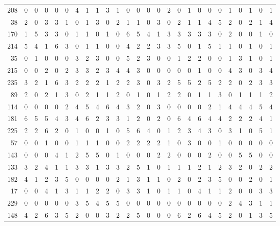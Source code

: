 \begin{longtable}{@{\extracolsep{\fill}}rccccccccccccccccccccccccc@{}}
208 & 0 & 0 & 0 & 0 & 0 & 4 & 1 & 1 & 3 & 1 & 0 & 0 & 0 & 0 & 2 & 0 & 1 & 0 & 0 & 0 & 1 & 0 & 1 & 0 & 1 \\
38 & 2 & 0 & 3 & 3 & 1 & 0 & 1 & 3 & 0 & 2 & 1 & 1 & 0 & 3 & 0 & 2 & 1 & 1 & 4 & 5 & 2 & 0 & 2 & 1 & 4 \\
170 & 1 & 5 & 3 & 3 & 0 & 1 & 1 & 0 & 1 & 0 & 6 & 5 & 4 & 1 & 3 & 3 & 3 & 3 & 3 & 0 & 2 & 0 & 0 & 1 & 0 \\
214 & 5 & 4 & 1 & 6 & 3 & 0 & 1 & 1 & 0 & 0 & 4 & 2 & 2 & 3 & 3 & 5 & 0 & 1 & 5 & 1 & 1 & 0 & 1 & 0 & 1 \\
35 & 0 & 1 & 0 & 0 & 0 & 3 & 2 & 3 & 0 & 0 & 5 & 2 & 3 & 0 & 0 & 1 & 2 & 2 & 0 & 0 & 1 & 3 & 1 & 0 & 1 \\
215 & 0 & 0 & 2 & 0 & 2 & 3 & 3 & 2 & 3 & 4 & 4 & 3 & 0 & 0 & 0 & 0 & 0 & 1 & 0 & 0 & 4 & 3 & 0 & 3 & 4 \\
235 & 3 & 2 & 1 & 6 & 3 & 2 & 2 & 2 & 1 & 2 & 2 & 3 & 0 & 3 & 2 & 5 & 5 & 2 & 5 & 2 & 2 & 0 & 2 & 3 & 3 \\
89 & 2 & 0 & 2 & 1 & 3 & 0 & 2 & 1 & 1 & 2 & 0 & 1 & 0 & 1 & 2 & 2 & 0 & 1 & 1 & 3 & 0 & 1 & 1 & 1 & 2 \\
114 & 0 & 0 & 0 & 0 & 2 & 4 & 5 & 4 & 6 & 4 & 3 & 2 & 0 & 3 & 0 & 0 & 0 & 0 & 2 & 1 & 4 & 4 & 4 & 5 & 4 \\
181 & 6 & 5 & 5 & 4 & 3 & 4 & 6 & 2 & 3 & 3 & 1 & 2 & 0 & 2 & 0 & 6 & 4 & 6 & 4 & 4 & 2 & 2 & 2 & 4 & 1 \\
225 & 2 & 2 & 6 & 2 & 0 & 1 & 0 & 0 & 1 & 0 & 5 & 6 & 4 & 0 & 1 & 2 & 3 & 4 & 3 & 0 & 3 & 1 & 0 & 5 & 1 \\
57 & 0 & 0 & 1 & 0 & 0 & 1 & 1 & 1 & 0 & 0 & 2 & 2 & 2 & 2 & 1 & 0 & 3 & 0 & 0 & 1 & 0 & 0 & 0 & 0 & 0 \\
143 & 0 & 0 & 0 & 4 & 1 & 2 & 5 & 5 & 0 & 1 & 0 & 0 & 0 & 2 & 2 & 0 & 0 & 0 & 2 & 0 & 0 & 5 & 5 & 0 & 0 \\
133 & 3 & 2 & 4 & 1 & 1 & 3 & 3 & 1 & 3 & 3 & 2 & 5 & 1 & 0 & 1 & 1 & 1 & 2 & 1 & 2 & 3 & 2 & 0 & 2 & 2 \\
182 & 4 & 1 & 2 & 3 & 5 & 0 & 0 & 0 & 0 & 2 & 1 & 3 & 1 & 1 & 0 & 2 & 0 & 2 & 3 & 5 & 0 & 0 & 2 & 0 & 1 \\
17 & 0 & 0 & 4 & 1 & 3 & 1 & 1 & 2 & 2 & 0 & 3 & 3 & 1 & 0 & 1 & 1 & 0 & 4 & 1 & 1 & 2 & 0 & 0 & 3 & 3 \\
229 & 0 & 0 & 0 & 0 & 0 & 3 & 5 & 4 & 5 & 5 & 0 & 0 & 0 & 0 & 0 & 0 & 0 & 0 & 0 & 0 & 2 & 4 & 3 & 1 & 1 \\
148 & 4 & 2 & 6 & 3 & 5 & 2 & 0 & 0 & 3 & 2 & 2 & 5 & 0 & 0 & 0 & 6 & 2 & 6 & 4 & 5 & 2 & 0 & 1 & 3 & 5 \\

\end{longtable}
